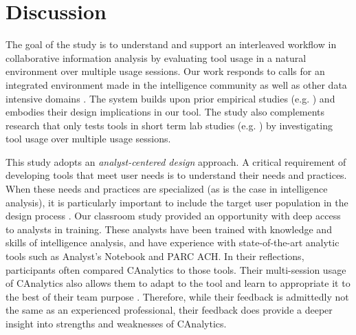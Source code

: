 \section{Discussion}\label{discussion}

The goal of the study is to understand and support an interleaved workflow in
collaborative information analysis by evaluating tool usage in a natural
environment over multiple usage sessions. Our work responds to calls for an
integrated environment made in the intelligence community as well as other data
intensive domains \cite{Shah2014i, Chen2016, Vision2015, Amershi2015, Ware2012}.
The system builds upon prior empirical studies (e.g. \cite{Carroll2013,
Borge2012,Kang2011,Chin2009}) and embodies their design implications in our
tool. The study also complements research that only tests tools in short term
lab studies (e.g. \cite{Convertino2011,Goyal2016,Hajizadeh2013}) by
investigating tool usage over multiple usage sessions.

This study adopts an \emph{analyst-centered design} approach. A critical
requirement of developing tools that meet user needs is to understand their
needs and practices. When these needs and practices are specialized (as is the
case in intelligence analysis), it is particularly important to include the
target user population in the design process \cite{Scholtz2014}. Our classroom
study provided an opportunity with deep access to analysts in training. These
analysts have been trained with knowledge and skills of intelligence analysis,
and have experience with state-of-the-art analytic tools such as Analyst's
Notebook and PARC ACH. In their reflections, participants often compared
CAnalytics to those tools. Their multi-session usage of CAnalytics also allows
them to adapt to the tool and learn to appropriate it to the best of their team
purpose \cite{Stahl2006}. Therefore, while their feedback is admittedly not the
same as an experienced professional, their feedback does provide a deeper
insight into strengths and weaknesses of CAnalytics.

